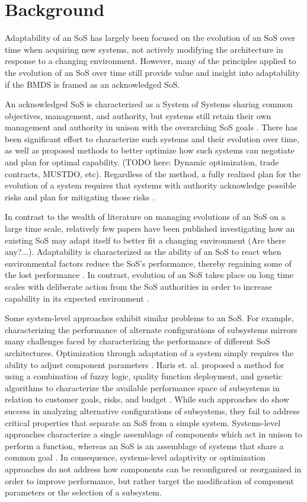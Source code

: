 \section{Background}

Adaptability of an SoS has largely been focused on the evolution of an SoS over time when acquiring new systems, not actively modifying the architecture in response to a changing environment. However, many of the principles applied to the evolution of an SoS over time still provide value and insight into adaptability if the BMDS is framed as an acknowledged SoS.

An acknowledged SoS is characterized as a System of Systems sharing common objectives, management, and authority, but systems still retain their own management and authority in unison with the overarching SoS goals \cite{Agarwal2014, Agarwal2015, Zhemei2018}. There has been significant effort to characterize such systems and their evolution over time, as well as proposed methods to better optimize how such systems can negotiate and plan for optimal capability. (TODO here: Dynamic optimization, trade contracts, MUSTDO, etc). Regardless of the method, a fully realized plan for the evolution of a system requires that systems with authority acknowledge possible risks and plan for mitigating those risks \cite{Zhemei2018}. 

In contrast to the wealth of literature on managing evolutions of an SoS on a large time scale, relatively few papers have been published investigating how an existing SoS may adapt itself to better fit a changing environment (Are there any?...). Adaptability is characterized as the ability of an SoS to react when environmental factors reduce the SoS's performance, thereby regaining some of the lost performance \cite{Ackoff1971}. In contrast, evolution of an SoS takes place on long time scales with deliberate action from the SoS authorities in order to increase capability in its expected environment \cite{}.

Some system-level approaches exhibit similar problems to an SoS. For example, characterizing the performance of alternate configurations of subsystems mirrors many challenges faced by characterizing the performance of different SoS architectures. Optimization through adaptation of a system simply requires the ability to adjust component parameters \cite{DeRoo2009}. Haris et. al. proposed a method for using a combination of fuzzy logic, quality function deployment, and genetic algorithms to characterize the available performance space of subsystems in relation to customer goals, risks, and budget \cite{Haris2011}. While such approaches do show success in analyzing alternative configurations of subsystems, they fail to address critical properties that separate an SoS from a simple system. Systems-level approaches characterize a single assemblage of components which act in unison to perform a function, whereas an SoS is an assemblage of systems that share a common goal \cite{Maier1996}. In consequence, systems-level adaptivity or optimization approaches do not address how components can be reconfigured or reorganized in order to improve performance, but rather target the modification of component parameters or the selection of a subsystem.